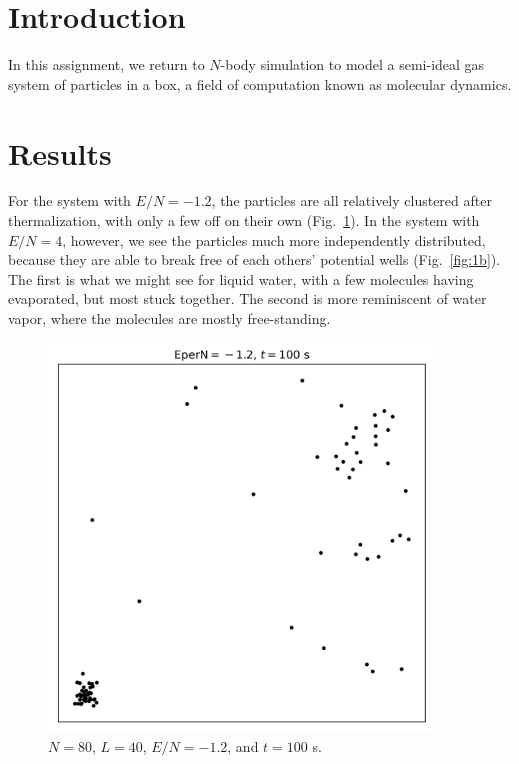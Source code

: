 \documentclass{article}
\author{\hwauthor}
\title{\hwtitle}
\date{\hwdate}
\begin{document}
\maketitle
\thispagestyle{fancy}

\section{Introduction}

In this assignment, we return to $N$-body simulation to model a semi-ideal gas system of particles in a box, a field of computation known as molecular dynamics.

\section{Results}

\bigskip
{}
\medskip

For the system with $E/N=-1.2$, the particles are all relatively clustered after thermalization, with only a few off on their own (Fig.~\ref{fig:1a}). In the system with $E/N=4$, however, we see the particles much more independently distributed, because they are able to break free of each others' potential wells (Fig.~\ref{fig:1b}). The first is what we might see for liquid water, with a few molecules having evaporated, but most stuck together. The second is more reminiscent of water vapor, where the molecules are mostly free-standing.

\begin{figure}[H]
    \centering
    \includegraphics[width=4in]{homework8/p1a.png}
    \caption{$N=80$, $L=40$, $E/N=-1.2$, and $t=100$ s.}
    \label{fig:1a}
\end{figure}
\end{document}
